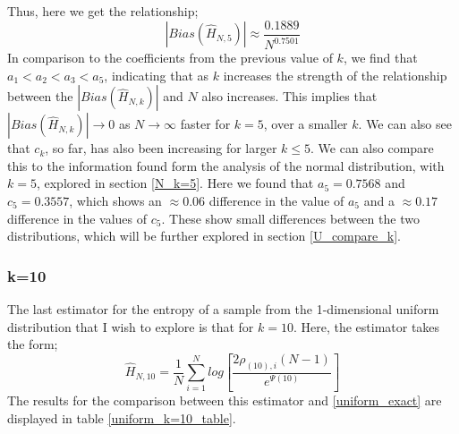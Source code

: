 \documentclass{article}
\begin{document}
Thus, here we get the relationship;
\begin{equation}
|Bias(\hat{H}_{N, 5})| \approx \frac{0.1889}{N^{0.7501}}\nonumber
\end{equation}
In comparison to the coefficients from the previous value of $k$, we find that $a_{1} < a_{2} < a_{3} < a_{5}$, indicating that as $k$ increases the strength of the relationship between the $|Bias(\hat{H}_{N, k})|$ and $N$ also increases. This implies that $|Bias(\hat{H}_{N, k})| \to 0$ as $N \to \infty$ faster for $k=5$, over a smaller $k$. We can also see that $c_{k}$, so far, has also been increasing for larger $k \leq 5$.
We can also compare this to the information found form the analysis of the normal distribution, with $k=5$, explored in section \ref{N_k=5}. Here we found that $a_{5}=0.7568$ and $c_{5}=0.3557$, which shows an $\approx 0.06$ difference in the value of $a_{5}$ and a $\approx 0.17$ difference in the values of $c_{5}$. These show small differences between the two distributions, which will be further explored in section \ref{U_compare_k}.






\subsubsection{k=10} \label{U_k=10}
The last estimator for the entropy of a sample from the 1-dimensional uniform distribution that I wish to explore is that for $k=10$. Here, the estimator takes the form;
\begin{equation}
\hat{H}_{N, 10} = \frac{1}{N} \sum_{i=1}^{N} log \left[ \frac{2\rho_{(10),i}(N-1)}{e^{\Psi(10)}} \right] \nonumber
\end{equation}
The results for the comparison between this estimator and \ref{uniform_exact} are displayed in table \ref{uniform_k=10_table}.
\end{document}
